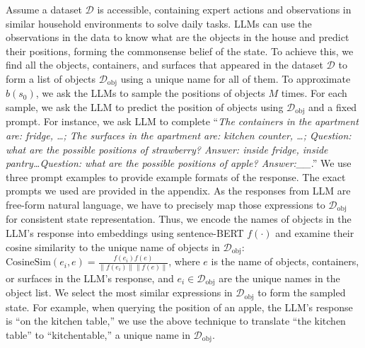 Assume a dataset $\mathcal{D}$ is accessible, containing expert actions and observations in similar household environments to solve daily tasks. LLMs can use the observations in the data to know what are the objects in the house and predict their positions, forming the commonsense belief of the state. 
To achieve this, we find all the objects, containers, and surfaces that appeared in the dataset $\mathcal{D}$ to form a list of objects $\mathcal{D}_\mathrm{obj}$ using a unique name for all of them. To approximate $b(s_0)$, we ask the LLMs to sample the positions of objects $M$ times. For each sample, we ask the LLM to predict the position of objects using $\mathcal{D}_\mathrm{obj}$ and a fixed prompt. For instance, we ask LLM to complete ``\textit{The containers in the apartment are: fridge, \ldots; The surfaces in the apartment are: kitchen counter, \ldots; Question: what are the possible positions of strawberry? Answer: inside fridge, inside pantry\ldots Question: what are the possible positions of apple? Answer:\_\_}.'' We use three prompt examples to provide example formats of the response. The exact prompts we used are provided in the appendix. As the responses from LLM are free-form natural language, we have to precisely map those expressions to $\mathcal{D}_\mathrm{obj}$ for consistent state representation. Thus, we encode the names of objects in the LLM's response into embeddings using sentence-BERT $f(\cdot)$ \cite{reimers2019sentence} and examine their cosine similarity to the unique name of objects in $\mathcal{D}_\mathrm{obj}$: $\mathrm{CosineSim}(e_i, e)=\frac{f(e_i)f(e)}{\|f(e_i)\|\|f(e)\|}$, where $e$ is the name of objects, containers, or surfaces in the LLM's response, and $e_i\in\mathcal{D}_\mathrm{obj}$ are the unique names in the object list. We select the most similar expressions in $\mathcal{D}_\mathrm{obj}$ to form the sampled state. For example, when querying the position of an apple, the LLM's response is ``on the kitchen table,'' we use the above technique to translate ``the kitchen table'' to ``kitchentable,'' a unique name in $\mathcal{D}_\mathrm{obj}$.



